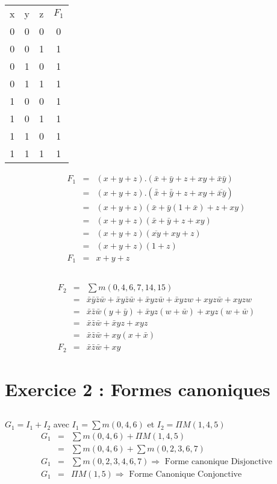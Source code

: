 \documentclass[12pt,a4paper,openany]{book}
\begin{document}
	\subsection{}
	\begin{tabular}{ccc||c}
		x&y&z & $F_1$\\
		0&0&0&	0\\
		0&0&1& 	1\\
		0&1&0& 	1\\
		0&1&1& 	1\\
		1&0&0& 	1\\
		1&0&1& 	1\\
		1&1&0& 	1\\
		1&1&1& 	1\\
	\end{tabular}
	\begin{eqnarray*}
		F_1 &=& (x+y+z).(\bar x + \bar y + z + xy + \bar x \bar y)\\
		&=& (x+y+z).(\bar{\bar x} + \bar{\bar y} + z + xy + \overline{\bar x \bar y})\\
		&=& (x+y+z)(\bar x + \bar y (1 + \bar x) + z +xy)\\
		&=& (x+y+z)(\bar x + \bar y + z + xy)\\
		&=& (x+y+z)(\overline{xy} + xy + z)\\
		&=& (x+y+z)(1+z)\\
		F_1 &=& x+y+z
	\end{eqnarray*}
	\subsection{}
	\begin{eqnarray*}
		F_2 &=& \sum m(0,4,6,7,14,15)\\
		&=& \bar x \bar y \bar z \bar w + \bar x y \bar z \bar w + \bar x y z \bar w + \bar x yzw + xyz\bar w + xyzw\\
		&=& \bar x \bar z \bar w(y+\bar y) +\bar x yz (w+\bar w) + xyz(w + \bar w)\\
		&=& \bar x \bar z \bar w + \bar x y z + xyz\\
		&=& \bar x \bar z \bar w + xy(x + \bar x)\\
		F_2 &=& \bar x \bar z \bar w + xy
	\end{eqnarray*}
	\section{Exercice 2 : Formes canoniques}
	\subsection{}
	$G_1 = I_1 + I_2$ avec $I_1 = \sum m (0,4,6)$ et $I_2 = \Pi M(1,4,5)$
	\begin{eqnarray*}
		G_1 &=& \sum m(0,4,6) + \Pi M(1,4,5)\\
		&=& \sum m(0,4,6) + \sum m (0,2,3,6,7)\\
		G_1 &=& \sum m (0,2,3,4,6,7) \Rightarrow \textrm{ Forme canonique Disjonctive}\\
		G_1 &=& \Pi M (1,5) \Rightarrow \textrm{ Forme Canonique Conjonctive}
	\end{eqnarray*}
	
\end{document}
